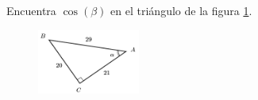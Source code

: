 Encuentra $\cos(\beta)$ en el triángulo de la figura \ref{fig:functrig11}.
\begin{figure}[H]
    \begin{center}
        \includegraphics[width=0.3\textwidth]{../images/functrig11.png}
    \end{center}
    \caption{}
    \label{fig:functrig11}
\end{figure}
